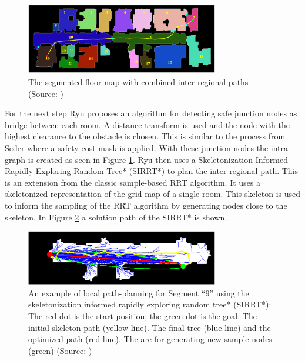 \begin{figure}[h]
    \centering
    \includegraphics[width=0.75\textwidth]{figures/20_state_of_the_art/ryu_floor_path.png}
    \caption[The segmented floor map with combined inter-regional paths]{The segmented floor map with combined inter-regional paths (Source: \cite{ryu_hierarchical_2020})}
    \label{fig:ryu_floor_path}
\end{figure}

For the next step Ryu proposes an algorithm for detecting safe junction nodes as bridge between each room. A distance transform is used and the node with the highest clearance to the obstacle is chosen. This is similar to the process from Seder where a safety cost mask is applied. With these junction nodes the intra-graph is created as seen in Figure \ref{fig:ryu_floor_path}. Ryu then uses a Skeletonization-Informed Rapidly Exploring Random Tree* (SIRRT*) to plan the inter-regional path. This is an extension from the classic sample-based RRT algorithm. It uses a skeletonized representation of the grid map of a single room. This skeleton is used to inform the sampling of the RRT algorithm by generating nodes close to the skeleton. In Figure \ref{fig:ryu_sirrt} a solution path of the SIRRT* is shown. 

\begin{figure}[h]
    \centering
    \includegraphics[width=0.75\textwidth]{figures/20_state_of_the_art/ryu_sirrt.png}
    \caption[Path planning with the SIRRT*]{An example of local path-planning for Segment “9” using the skeletonization informed rapidly exploring random tree* (SIRRT*): The red dot is the start position; the green dot is the goal. The initial skeleton path (yellow line). The final tree (blue line) and the optimized path (red line). The are for generating new sample nodes (green) (Source: \cite{ryu_hierarchical_2020})}
    \label{fig:ryu_sirrt}
\end{figure}

